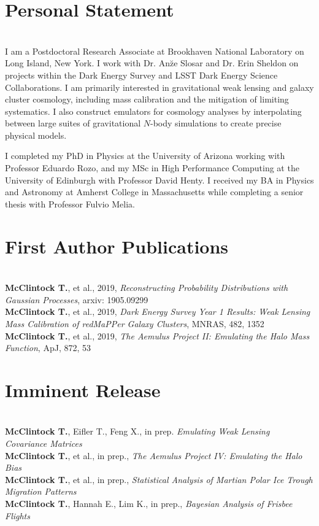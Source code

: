 \documentclass{res}
\begin{document}
\begin{resume}
\section{Personal Statement}
\vspace{-8pt}
\hrulefill\\
I am a Postdoctoral Research Associate at Brookhaven National Laboratory on Long Island, New York. I work with Dr. An\u{z}e Slosar and Dr. Erin Sheldon on projects within the Dark Energy Survey and LSST Dark Energy Science Collaborations. I am primarily interested in gravitational weak lensing and galaxy cluster cosmology, including mass calibration and the mitigation of limiting systematics. I also construct emulators for cosmology analyses by interpolating between large suites of gravitational $N$-body simulations to create precise physical models.

I completed my PhD in Physics at the University of Arizona working with Professor Eduardo Rozo, and my MSc in High Performance Computing at the University of Edinburgh with Professor David Henty. I received my BA in Physics and Astronomy at Amherst College in Massachusetts while completing a senior thesis with Professor Fulvio Melia.

\section{First Author Publications}
\vspace{-8pt}
\hrulefill\\
{\bf McClintock T.}, et al., 2019, {\it Reconstructing Probability Distributions with Gaussian Processes}, arxiv: 1905.09299\\
{\bf McClintock T.}, et al., 2019, {\it Dark Energy Survey Year 1 Results: Weak Lensing Mass Calibration of redMaPPer Galaxy Clusters}, MNRAS, 482, 1352\\
{\bf McClintock T.}, et al., 2019, {\it The Aemulus Project II: Emulating the Halo Mass Function}, ApJ, 872, 53

\section{Imminent Release}
\vspace{-8pt}
\hrulefill\\
{\bf McClintock T.}, Eifler T., Feng X., in prep. {\it Emulating Weak Lensing Covariance Matrices}\\
{\bf McClintock T.}, et al., in prep., {\it The Aemulus Project IV: Emulating the Halo Bias}\\
{\bf McClintock T.}, et al., in prep., {\it Statistical Analysis of Martian Polar Ice Trough Migration Patterns}\\
{\bf McClintock T.}, Hannah E., Lim K., in prep., {\it Bayesian Analysis of Frisbee Flights}


\end{resume}
\end{document}
